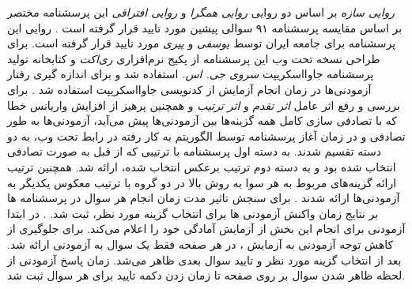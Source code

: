 \!\citep{jonasonDirtyDozenConcise2010}
\textit{
    روایی سازه
}
بر اساس دو روایی
\textit{
    روایی همگرا
}
و
\textit{
    روایی افتراقی
}
این پرسشنامه مختصر بر اساس مقایسه پرسشنامه ۹۱ سوالی پیشین مورد تایید قرار گرفته است
\!\citep{jonasonDirtyDozenConcise2010}
\!.
روایی این پرسشنامه برای جامعه ایران توسط
\textit{
    یوسفی
}
و
\textit{
    پیری
}
\!\citep{ywsfyWyjgyHyRwn2016}
مورد تایید قرار گرفته است.
برای طراحی نسخه تحت وب این پرسشنامه از پکیج نرم‌افزاری
\textit{
    ری‌اکت
}
و کتابخانه تولید پرسشنامه جاوااسکریپت
\textit{
    سروی جی. اس.
}
استفاده شد و برای اندازه گیری رفتار آزمودنی‌ها در زمان انجام آزمایش از کدنویسی جاوااسکریپت استفاده شد
\!.
برای بررسی و رفع اثر عامل
\textit{
    اثر تقدم
}
و
\textit{
    اثر ترتیب
}
\!\citep{dillmanMultipleAnswerQuestions2003,krosnickEVALUATIONCOGNITIVETHEORY1987,leeEffectQuestionOrder2009}
و همچنین پرهیز از افزایش واریانس خطا که
با تصادفی سازی کامل همه گزینه‌ها بین آزمودنی‌ها پیش می‌آید،
\!\citep{dillmanMultipleAnswerQuestions2003}
آزمودنی‌ها به طور تصادفی و در زمان آغاز پرسشنامه
توسط الگوریتم به کار رفته در رابط تحت وب، به دو دسته تقسیم
شدند. به دسته اول پرسشنامه با ترتیبی که از قبل به
صورت تصادفی انتخاب شده بود و به دسته دوم ترتیب برعکس  انتخاب شده،
ارائه شد. همچنین ترتیب
ارائه گزینه‌های مربوط به هر سوا به روش بالا در دو گروه با ترتیب معکوس یکدیگر به آزمودنی‌ها ارائه شدند
{\citep{dayOrderingEffectsChoice2012}}
{.}
برای سنجش تاثیر مدت زمان انجام هر سوال در پرسشنامه ها
بر نتایج زمان واکنش  آزمودنی ها برای انتخاب گزینه مورد نظر،
ثبت شد.
{\citep{malhotraCompletionTimeResponse2008}}
{.}
در ابتدا آزمودنی برای انجام این بخش از آزمایش آمادگی خود را اعلام می‌کند.
برای جلوگیری از کاهش توجه آزمودنی به آزمایش
\!\citep{meadeIdentifyingCarelessResponses2012}
،
در هر صفحه فقط یک سوال به آزمودنی ارائه شد.
بعد از انتخاب گزینه مورد نظر و تایید سوال بعدی ظاهر می‌شد.
زمان پاسخ آزمودنی از لحظه ظاهر شدن سوال بر روی صفحه
تا زمان زدن دکمه تایید برای هر سوال ثبت شد.
